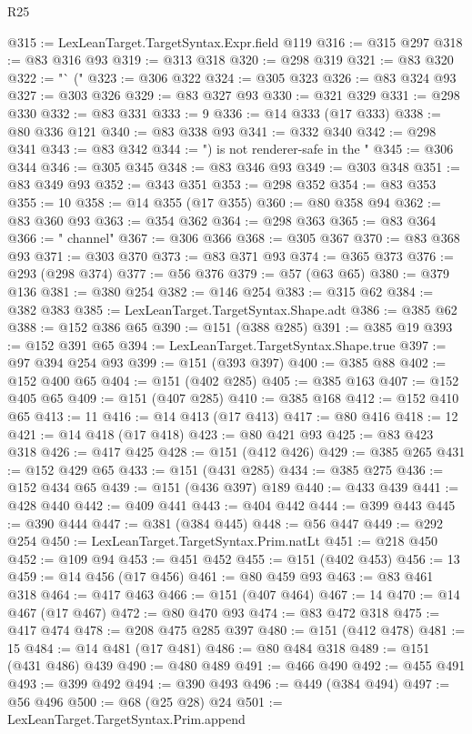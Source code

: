 \begin{lexlean}{R25}
\begin{coremodule}
@315 := LexLeanTarget.TargetSyntax.Expr.field @119
@316 := @315 @297
@318 := @83 @316 @93
@319 := @313 @318
@320 := @298 @319
@321 := @83 @320
@322 := "` ("
@323 := @306 @322
@324 := @305 @323
@326 := @83 @324 @93
@327 := @303 @326
@329 := @83 @327 @93
@330 := @321 @329
@331 := @298 @330
@332 := @83 @331
@333 := 9
@336 := @14 @333 (@17 @333)
@338 := @80 @336 @121
@340 := @83 @338 @93
@341 := @332 @340
@342 := @298 @341
@343 := @83 @342
@344 := ") is not renderer-safe in the "
@345 := @306 @344
@346 := @305 @345
@348 := @83 @346 @93
@349 := @303 @348
@351 := @83 @349 @93
@352 := @343 @351
@353 := @298 @352
@354 := @83 @353
@355 := 10
@358 := @14 @355 (@17 @355)
@360 := @80 @358 @94
@362 := @83 @360 @93
@363 := @354 @362
@364 := @298 @363
@365 := @83 @364
@366 := " channel"
@367 := @306 @366
@368 := @305 @367
@370 := @83 @368 @93
@371 := @303 @370
@373 := @83 @371 @93
@374 := @365 @373
@376 := @293 (@298 @374)
@377 := @56 @376
@379 := @57 (@63 @65)
@380 := @379 @136
@381 := @380 @254
@382 := @146 @254
@383 := @315 @62
@384 := @382 @383
@385 := LexLeanTarget.TargetSyntax.Shape.adt
@386 := @385 @62
@388 := @152 @386 @65
@390 := @151 (@388 @285)
@391 := @385 @19
@393 := @152 @391 @65
@394 := LexLeanTarget.TargetSyntax.Shape.true
@397 := @97 @394 @254 @93
@399 := @151 (@393 @397)
@400 := @385 @88
@402 := @152 @400 @65
@404 := @151 (@402 @285)
@405 := @385 @163
@407 := @152 @405 @65
@409 := @151 (@407 @285)
@410 := @385 @168
@412 := @152 @410 @65
@413 := 11
@416 := @14 @413 (@17 @413)
@417 := @80 @416
@418 := 12
@421 := @14 @418 (@17 @418)
@423 := @80 @421 @93
@425 := @83 @423 @318
@426 := @417 @425
@428 := @151 (@412 @426)
@429 := @385 @265
@431 := @152 @429 @65
@433 := @151 (@431 @285)
@434 := @385 @275
@436 := @152 @434 @65
@439 := @151 (@436 @397) @189
@440 := @433 @439
@441 := @428 @440
@442 := @409 @441
@443 := @404 @442
@444 := @399 @443
@445 := @390 @444
@447 := @381 (@384 @445)
@448 := @56 @447
@449 := @292 @254
@450 := LexLeanTarget.TargetSyntax.Prim.natLt
@451 := @218 @450
@452 := @109 @94
@453 := @451 @452
@455 := @151 (@402 @453)
@456 := 13
@459 := @14 @456 (@17 @456)
@461 := @80 @459 @93
@463 := @83 @461 @318
@464 := @417 @463
@466 := @151 (@407 @464)
@467 := 14
@470 := @14 @467 (@17 @467)
@472 := @80 @470 @93
@474 := @83 @472 @318
@475 := @417 @474
@478 := @208 @475 @285 @397
@480 := @151 (@412 @478)
@481 := 15
@484 := @14 @481 (@17 @481)
@486 := @80 @484 @318
@489 := @151 (@431 @486) @439
@490 := @480 @489
@491 := @466 @490
@492 := @455 @491
@493 := @399 @492
@494 := @390 @493
@496 := @449 (@384 @494)
@497 := @56 @496
@500 := @68 (@25 @28) @24
@501 := LexLeanTarget.TargetSyntax.Prim.append

\end{coremodule}
\end{lexlean}
